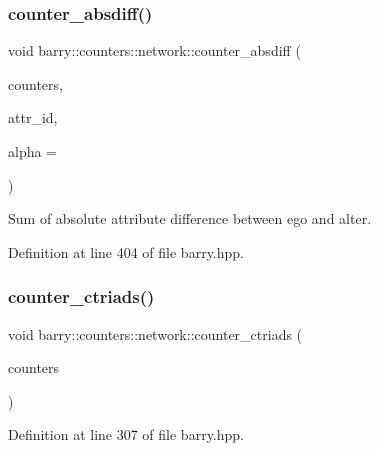 \subsubsection{\texorpdfstring{counter\+\_\+absdiff()}{counter\_absdiff()}}
{\footnotesize\ttfamily void barry\+::counters\+::network\+::counter\+\_\+absdiff (\begin{DoxyParamCaption}\item[{\hyperlink{namespacebarry_1_1counters_1_1network_a3b3c590303d47840d1967372ae495d95}{Net\+Counter\+Vector} $\ast$}]{counters,  }\item[{\hyperlink{namespacebarry_a11dfc53ddb4672278319aa04f1e09a6c}{uint}}]{attr\+\_\+id,  }\item[{double}]{alpha = {} }\end{DoxyParamCaption})\hspace{0.3cm}{\ttfamily [inline]}}



Sum of absolute attribute difference between ego and alter. 



Definition at line 404 of file barry.\+hpp.

\mbox{\label{namespacebarry_1_1counters_1_1network_a5262c1e8a14c9956041adead348a4890}} 
\subsubsection{\texorpdfstring{counter\+\_\+ctriads()}{counter\_ctriads()}}
{\footnotesize\ttfamily void barry\+::counters\+::network\+::counter\+\_\+ctriads (\begin{DoxyParamCaption}\item[{\hyperlink{namespacebarry_1_1counters_1_1network_a3b3c590303d47840d1967372ae495d95}{Net\+Counter\+Vector} $\ast$}]{counters }\end{DoxyParamCaption})\hspace{0.3cm}{\ttfamily [inline]}}



Definition at line 307 of file barry.\+hpp.

\mbox{\label{namespacebarry_1_1counters_1_1network_a8c7ef19041094ac55a17106940c7d244}} 
